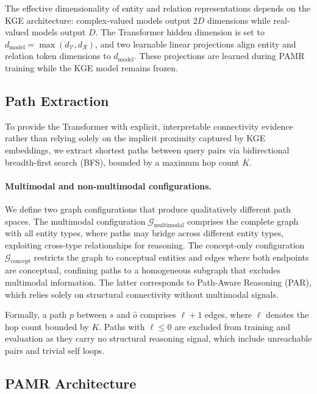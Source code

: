\documentclass[runningheads]{llncs}
\begin{document}
The effective dimensionality of entity and relation representations
depends on the KGE architecture: complex-valued models output $2D$
dimensions while real-valued models output $D$. The Transformer
hidden dimension is set to $d_{\text{model}} = \max(d_{\mathcal{V}},
d_{\mathcal{R}})$, and two learnable linear projections align entity
and relation token dimensions to $d_{\text{model}}$. These
projections are learned during PAMR training while the KGE model
remains frozen.

\subsection{Path Extraction}
\label{sec:path-extraction}

To provide the Transformer with explicit, interpretable connectivity evidence rather than
relying solely on the implicit proximity captured by KGE embeddings, we extract shortest
paths between query pairs via bidirectional breadth-first search (BFS), bounded by a
maximum hop count $K$.

\paragraph{Multimodal and non-multimodal configurations.}
We define two graph configurations that produce qualitatively different path spaces.
The multimodal configuration $\mathcal{G}_{\text{multimodal}}$ comprises the complete
graph with all entity types, where paths may bridge across different entity types,
exploiting cross-type relationships for reasoning.  The concept-only configuration
$\mathcal{G}_{\text{concept}}$ restricts the graph to conceptual entities and
edges where both endpoints are conceptual, confining paths to a homogeneous
subgraph that excludes multimodal information.  The latter corresponds to
Path-Aware Reasoning (PAR), which relies solely on structural connectivity
without multimodal signals.

Formally, a path $p$ between $s$ and $\hat{o}$ comprises $\ell + 1$ edges, where
$\ell$ denotes the hop count bounded by $K$.
Paths with $\ell \leq 0$ are excluded from training and evaluation as they
carry no structural reasoning signal, which include unreachable pairs and
trivial self loops.

\subsection{PAMR Architecture}
\label{sec:pamr-architecture}
\end{document}
